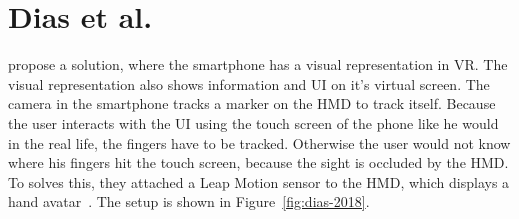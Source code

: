 \section{Dias et al.}\label{section:dias-2018}
\citeauthor{Dias.2018} propose a solution, where the smartphone has a visual representation in \ac{VR}. The visual representation also shows information and \ac{UI} on it's virtual screen. The camera in the smartphone tracks a marker on the \ac{HMD} to track itself. Because the user interacts with the \ac{UI} using the touch screen of the phone like he would in the real life, the fingers have to be tracked. Otherwise the user would not know where his fingers hit the touch screen, because the sight is occluded by the \ac{HMD}. To solves this, they attached a Leap Motion sensor to the \ac{HMD}, which displays a hand avatar~\cite{Dias.2018}. The setup is shown in Figure~\ref{fig:dias-2018}. 

